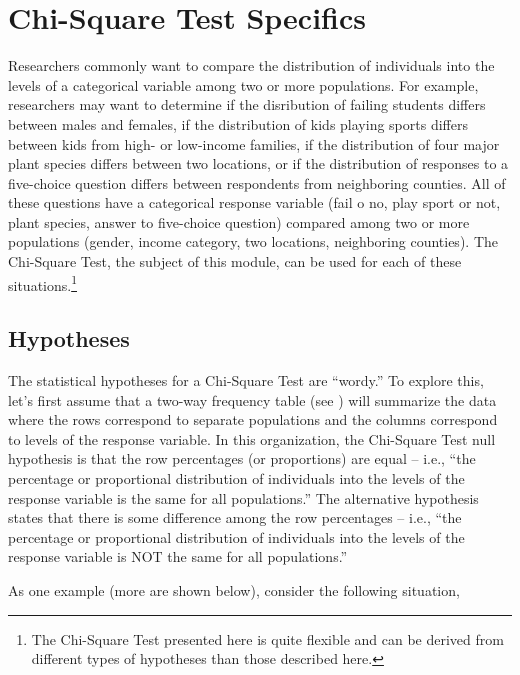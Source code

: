 \documentclass[10pt,openany]{book}\usepackage[]{graphicx}\usepackage[]{color}
\begin{document}
\section{Chi-Square Test Specifics}
Researchers commonly want to compare the distribution of individuals into the levels of a categorical variable among two or more populations. For example, researchers may want to determine if the disribution of failing students differs between males and females, if the distribution of kids playing sports differs between kids from high- or low-income families, if the distribution of four major plant species differs between two locations, or if the distribution of responses to a five-choice question differs between respondents from neighboring counties.  All of these questions have a categorical response variable (fail o no, play sport or not, plant species, answer to five-choice question) compared among two or more populations (gender, income category, two locations, neighboring counties). The Chi-Square Test, the subject of this module, can be used for each of these situations.\footnote{The Chi-Square Test presented here is quite flexible and can be derived from different types of hypotheses than those described here.}


\subsection{Hypotheses}
\vspace{-12pt}
The statistical hypotheses for a Chi-Square Test are ``wordy.''  To explore this, let's first assume that a two-way frequency table (see ) will summarize the data where the rows correspond to separate populations and the columns correspond to levels of the response variable.  In this organization, the Chi-Square Test null hypothesis is that the row percentages (or proportions) are equal -- i.e., ``the percentage or proportional distribution of individuals into the levels of the response variable is the same for all populations.''  The alternative hypothesis states that there is some difference among the row percentages -- i.e., ``the percentage or proportional distribution of individuals into the levels of the response variable is NOT the same for all populations.''

As one example (more are shown below), consider the following situation,
\end{document}
